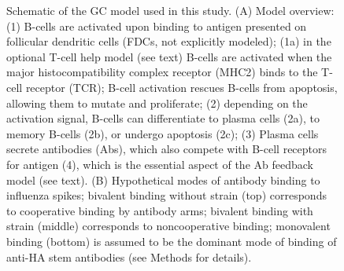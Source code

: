 \begin{figure}[hb]
\centering
{}
\caption{Schematic of the GC model used in this study. (A) Model overview: (1) B-cells are activated upon binding to antigen presented on
follicular dendritic cells (FDCs, not explicitly modeled); (1a) in the optional T-cell help model (see text) B-cells are
activated when the major histocompatibility complex receptor (MHC2) binds to the T-cell receptor (TCR); B-cell activation rescues
B-cells from apoptosis, allowing them to mutate and proliferate; (2) depending on the activation signal,
B-cells can differentiate to plasma cells (2a), to memory B-cells (2b), or undergo apoptosis (2c); (3) Plasma cells secrete antibodies
(Abs), which also compete with B-cell receptors for antigen (4), which is the essential aspect of the Ab feedback model\cite{zhang13}
(see text). (B) Hypothetical modes of antibody binding to influenza spikes; bivalent binding without strain (top) corresponds to
cooperative binding by antibody arms; bivalent binding with strain (middle) corresponds to noncooperative binding; monovalent binding (bottom) is assumed to be the
dominant mode of binding of anti-HA stem antibodies (see Methods for details).
}
\end{figure}
%
